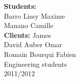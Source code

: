 \begin{titlepage}
        \vspace{4cm}
        \begin{flushleft}
	  \begin{tabbing}
		\hspace{8.5cm} \=\textbf{Students:} \\
		\> {\sc Barro} Lissy Maxime\\
                \> {\sc Manano} Camille\\
                \noindent \textbf{Clients:}
		 James\\
                \noindent David {\sc Auber}
                 Omar\\
                \noindent Romain {\sc Bourqui}
                 Fabien\\[0.3 cm]
                \>Engineering students \\
                 2011/2012\\
	  \end{tabbing}
        \end{flushleft}


\end{titlepage}

